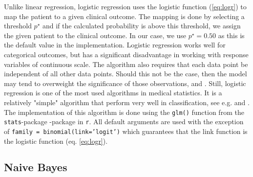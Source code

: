 \documentclass[../thesis.tex]{subfiles}
\begin{document}
\noindent Unlike linear regression, logistic regression uses the logistic function (\ref{eq:logr}) to map the patient to a given clinical outcome. The mapping is done by selecting a threshold $p^\star$ and if the calculated probability is above this threshold, we assign the given patient to the clinical outcome. In our case, we use $p^\star = 0.50$ as this is the default value in the implementation. Logistic regression works well for categorical outcomes, but has a significant disadvantage in working with response variables of continuous scale. The algorithm also requires that each data point be independent of all other data points. Should this not be the case, then the model may tend to overweight the significance of those observations, \cite{friedman2009elements} and \cite{james2013introduction}. Still, logistic regression is one of the most used algorithms in medical statistics. It is a relatively "simple" algorithm that perform very well in classification, see e.g. \cite{austin2013using} and \cite{zolfaghar2013big}. The implementation of this algorithm is done using the \texttt{glm()} function from the \texttt{stats}-package \cite{stats}-package in \texttt{r}. All default arguments are used with the exception of \texttt{family = binomial(link='logit')} which guarantees that the link function is the logistic function (eq. \ref{eq:logr}).

\subsection{Naive Bayes}
\label{subsec:nb}
\end{document}
